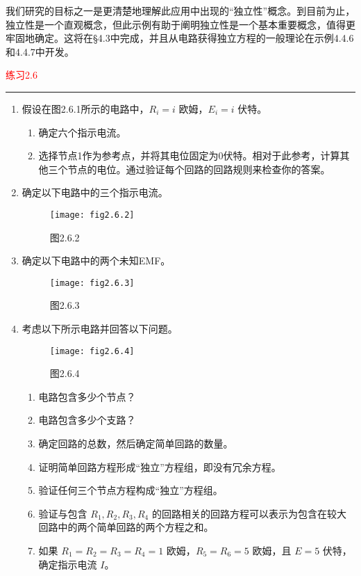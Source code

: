 我们研究的目标之一是更清楚地理解此应用中出现的“独立性”概念。到目前为止，独立性是一个直观概念，但此示例有助于阐明独立性是一个基本重要概念，值得更牢固地确定。这将在§4.3中完成，并且从电路获得独立方程的一般理论在示例4.4.6和4.4.7中开发。

\textcolor{red}{练习2.6}
\color{red}\rule{\textwidth}{0.4pt}\color{black}

\begin{enumerate}[leftmargin=*, label=\bfseries 2.6.\arabic*]
    \item 假设在图2.6.1所示的电路中，\(R_i = i\) 欧姆，\(E_i = i\) 伏特。
    \begin{enumerate}[label=(\alph*)]
        \item 确定六个指示电流。
        \item 选择节点1作为参考点，并将其电位固定为0伏特。相对于此参考，计算其他三个节点的电位。通过验证每个回路的回路规则来检查你的答案。
    \end{enumerate}

    \item 确定以下电路中的三个指示电流。
    \begin{figure}[h]
        \centering
        \texttt{[image: fig2.6.2]} 
        \caption{图2.6.2}
        \label{fig:2.6.2}
    \end{figure}

    \item 确定以下电路中的两个未知EMF。
    \begin{figure}[h]
        \centering
        \texttt{[image: fig2.6.3]} 
        \caption{图2.6.3}
        \label{fig:2.6.3}
    \end{figure}

    \item 考虑以下所示电路并回答以下问题。
    \begin{figure}[h]
        \centering
        \texttt{[image: fig2.6.4]} 
        \caption{图2.6.4}
        \label{fig:2.6.4}
    \end{figure}
    \begin{enumerate}[label=(\alph*)]
        \item 电路包含多少个节点？
        \item 电路包含多少个支路？
        \item 确定回路的总数，然后确定简单回路的数量。
        \item 证明简单回路方程形成“独立”方程组，即没有冗余方程。
        \item 验证任何三个节点方程构成“独立”方程组。
        \item 验证与包含 \(R_1, R_2, R_3, R_4\) 的回路相关的回路方程可以表示为包含在较大回路中的两个简单回路的两个方程之和。
        \item 如果 \(R_1 = R_2 = R_3 = R_4 = 1\) 欧姆，\(R_5 = R_6 = 5\) 欧姆，且 \(E = 5\) 伏特，确定指示电流 \(I\)。
    \end{enumerate}
\end{enumerate}
